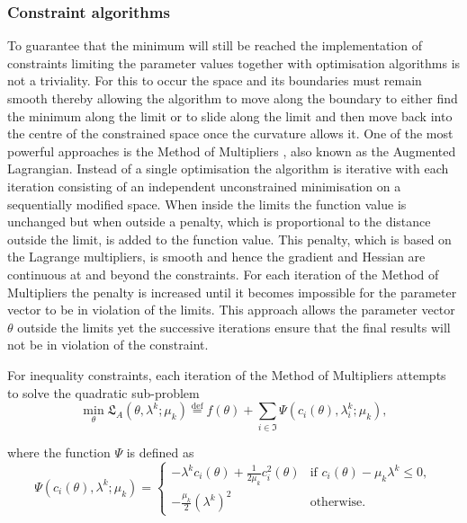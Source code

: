 \begin{htmlonly}
\begin{htmlonly}
\subsubsection{Constraint algorithms}

To guarantee that the minimum will still be reached the implementation of constraints limiting the parameter values together with optimisation algorithms is not a triviality.  For this to occur the space and its boundaries must remain smooth thereby allowing the algorithm to move along the boundary to either find the minimum along the limit or to slide along the limit and then move back into the centre of the constrained space once the curvature allows it.  One of the most powerful approaches is the Method of Multipliers \citep{NocedalWright99}, also known as the Augmented Lagrangian.  Instead of a single optimisation the algorithm is iterative with each iteration consisting of an independent unconstrained minimisation on a sequentially modified space.  When inside the limits the function value is unchanged but when outside a penalty, which is proportional to the distance outside the limit, is added to the function value.  This penalty, which is based on the Lagrange multipliers, is smooth and hence the gradient and Hessian are continuous at and beyond the constraints.  For each iteration of the Method of Multipliers the penalty is increased until it becomes impossible for the parameter vector to be in violation of the limits.  This approach allows the parameter vector $\theta$ outside the limits yet the successive iterations ensure that the final results will not be in violation of the constraint.

For inequality constraints, each iteration of the Method of Multipliers attempts to solve the quadratic sub-problem
\begin{equation} \label{eq: Augmented Lagrangian}
    \min_\theta \mathfrak{L}_A(\theta, \lambda^k; \mu_k) \stackrel{\mathrm{def}}{=} f(\theta) + \sum_{i \in \mathfrak{I}} \Psi(c_i(\theta), \lambda_i^k; \mu_k),
\end{equation}

\noindent where the function $\Psi$ is defined as
\begin{equation}
    \Psi(c_i(\theta), \lambda^k; \mu_k) = \begin{cases}
        -\lambda^k c_i(\theta) + \frac{1}{2\mu_k} c_i^2(\theta) & \textrm{if } c_i(\theta) - \mu_k \lambda^k \leqslant 0, \\
        -\frac{\mu_k}{2} (\lambda^k)^2 & \textrm{otherwise}.
    \end{cases}
\end{equation}


\end{htmlonly}
\end{htmlonly}
